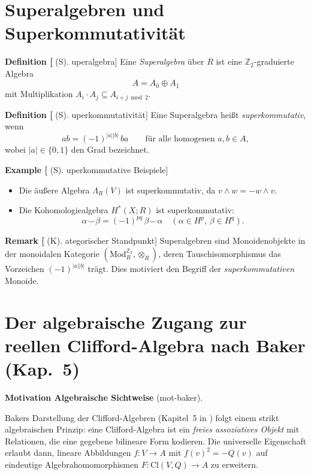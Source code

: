 \documentclass[10pt, letterpaper]{article}
\newcommand{\Mod}{\mathrm{Mod}}
\newcommand{\Cl}{\mathrm{Cl}}
\newcommand{\CustomHeading}[3]{%
  \par\medskip\noindent%
  \textbf{#1 #2} \textnormal{(#3)}.\enskip%
}
\newenvironment{DEF}[2]{\begin{unitbox}\CustomHeading{Definition}{#1}{#2}}{\end{unitbox}}
\newenvironment{REM}[2]{\begin{unitbox}\CustomHeading{Remark}{#1}{#2}}{\end{unitbox}}
\newenvironment{EXA}[2]{\begin{unitbox}\CustomHeading{Example}{#1}{#2}}{\end{unitbox}}
\newenvironment{MOT}[2]{\begin{unitbox}\CustomHeading{Motivation}{#1}{#2}}{\end{unitbox}}
\begin{document}
\section{Superalgebren und Superkommutativität}

\begin{DEF}[Superalgebra]
Eine \emph{Superalgebra} über \(R\) ist eine \(\mathbb{Z}_2\)-graduierte Algebra
\[
A=A_{\bar{0}}\oplus A_{\bar{1}}
\]
mit Multiplikation
\(A_i\cdot A_j\subseteq A_{i+j \bmod 2}\).
\end{DEF}

\begin{DEF}[Superkommutativität]
Eine Superalgebra heißt \emph{superkommutativ}, wenn
\[
ab = (-1)^{|a||b|}\,ba
\qquad \text{für alle homogenen }a,b\in A,
\]
wobei \(|a|\in\{0,1\}\) den Grad bezeichnet.
\end{DEF}

\begin{EXA}[Superkommutative Beispiele]
\begin{itemize}[leftmargin=*]
\item Die äußere Algebra \(\Lambda_R(V)\) ist superkommutativ,
da \(v\wedge w = - w\wedge v\).
\item Die Kohomologiealgebra \(H^\ast(X;R)\) ist superkommutativ:
\[
\alpha\smile\beta = (-1)^{pq}\,\beta\smile\alpha
\quad (\alpha\in H^p,\,\beta\in H^q).
\]
\end{itemize}
\end{EXA}

\begin{REM}[Kategorischer Standpunkt]
Superalgebren sind Monoidenobjekte in der monoidalen Kategorie
\((\Mod_R^{\mathbb{Z}_2},\otimes_R)\),
deren Tauschisomorphismus das Vorzeichen \((-1)^{|a||b|}\) trägt.
Dies motiviert den Begriff der \emph{superkommutativen} Monoide.
\end{REM}


\pagebreak

\section{Der algebraische Zugang zur reellen Clifford-Algebra nach Baker (Kap.~5)}
\label{sec:baker-clifford}

\begin{MOT}{Algebraische Sichtweise}{mot-baker}
Bakers Darstellung der Clifford-Algebren (Kapitel~5 in \cite{Baker2002})
folgt einem strikt algebraischen Prinzip:
eine Clifford-Algebra ist ein \emph{freies assoziatives Objekt} mit
Relationen, die eine gegebene bilineare Form kodieren.
Die universelle Eigenschaft erlaubt dann, lineare Abbildungen
$f:V\to A$ mit $f(v)^2=-Q(v)$ auf eindeutige Algebrahomomorphismen
$F:\Cl(V,Q)\to A$ zu erweitern.
\end{MOT}
\end{document}
